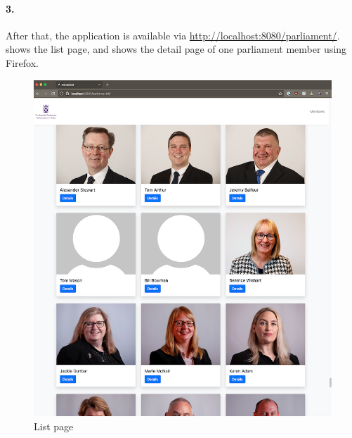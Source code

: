 \paragraph{3.}
After that, the application is available via \url{http://localhost:8080/parliament/}.  shows the list page, and  shows the detail page of one parliament member using Firefox.

\newpage

\begin{figure}[h]
\centering
\includegraphics[scale=1]{images/03_depl/member-list}
\caption{List page}
\label{fig:subsubsec:03_depl_list}
\end{figure}

\newpage

